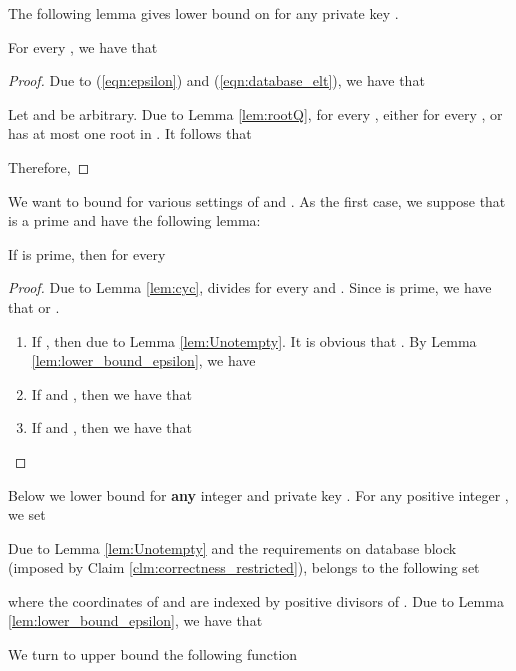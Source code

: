 \documentclass[JMC]{degruyter-journal}
\begin{document}
The following lemma gives  lower bound on  for
any private key .

\begin{lemma}\label{lem:lower_bound_epsilon}
For every , we have that 
\end{lemma}
\begin{proof}
Due to  (\ref{eqn:epsilon}) and
(\ref{eqn:database_elt}), we have that

Let  and  be arbitrary.  Due to Lemma
\ref{lem:rootQ}, for every , either  for every
, or  has at most one root in .
It follows that

Therefore,

\end{proof}






We want to bound  for various settings of  and .
As the first case, we suppose that  is a prime and have the following lemma:

\begin{lemma}\label{lem:lower_bound_eta_for_prime_n}
If  is  prime, then   for every 
\end{lemma}

\begin{proof}
Due to Lemma \ref{lem:cyc},  divides  for every
 and . Since  is prime, we have
that  or .
\begin{enumerate}
\item If , then  due to Lemma \ref{lem:Unotempty}. It is obvious that . By Lemma \ref{lem:lower_bound_epsilon},  we have

\item If  and , then we have that

\item If  and , then we have that

\end{enumerate}
\end{proof}




Below we lower bound  for {\bf any} integer  and  private key .
 For any positive integer , we
set
 
Due to Lemma \ref{lem:Unotempty} and the requirements on database
block  (imposed by Claim
 \ref{clm:correctness_restricted}),   belongs to the following set

where the coordinates of  and  are  indexed by
positive divisors of . Due to Lemma
\ref{lem:lower_bound_epsilon}, we have that

We turn to  upper bound the following function
\end{document}
